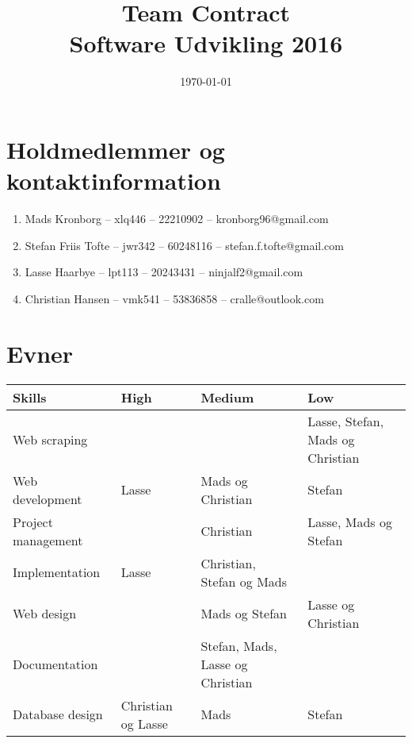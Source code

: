 \documentclass{article}
\title{
  \vspace{3cm}
  \Huge{Team Contract} \\
  \Large{Software Udvikling 2016}
}
\date{
    \today
}
\def \ColourPDF {../include/ku-farve}
\def \TitlePDF {../include/ku-en}  %
\begin{document}


\clearpage\maketitle
\thispagestyle{empty}

\newpage

\section{Holdmedlemmer og kontaktinformation}
\begin{enumerate}
\item Mads Kronborg – xlq446 – 22210902 – kronborg96@gmail.com
\item Stefan Friis Tofte – jwr342 – 60248116 – stefan.f.tofte@gmail.com
\item Lasse Haarbye – lpt113 – 20243431 – ninjalf2@gmail.com
\item Christian Hansen – vmk541 – 53836858 – cralle@outlook.com
\end{enumerate}
\section{Evner}
\begin{table}[ht]
\centering
\begin{tabular}{|l|l|l|l|}
\hline
\textbf{Skills}    & \textbf{High}      & \textbf{Medium}                  & \textbf{Low}                     \\ \hline
Web scraping       &                    &                                  & Lasse, Stefan, Mads og Christian \\ \hline
Web development    & Lasse              & Mads og Christian                & Stefan                           \\ \hline
Project management &                    & Christian                        & Lasse, Mads og Stefan            \\ \hline
Implementation     & Lasse              & Christian, Stefan og Mads        &                                  \\ \hline
Web design         &                    & Mads og Stefan                   & Lasse og Christian               \\ \hline
Documentation      &                    & Stefan, Mads, Lasse og Christian &                                  \\ \hline
Database design    & Christian og Lasse & Mads                             & Stefan                           \\ \hline
\end{tabular}
\end{table}
\end{document}
